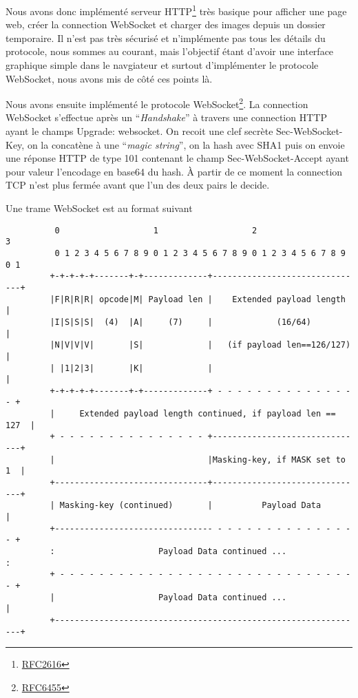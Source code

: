 \documentclass[a4paper,10pt]{article} %
\begin{document}
Nous avons donc implémenté serveur \textrm{HTTP}\footnote{\href{https://tools.ietf.org/html/rfc2616}{RFC2616}} très basique pour afficher une page web, créer la connection WebSocket et charger des images depuis un dossier temporaire. Il n'est pas très sécurisé et n'implémente pas tous les détails du protocole, nous sommes au courant, mais l'objectif étant d'avoir une interface graphique simple dans le navgiateur et surtout d'implémenter le protocole WebSocket, nous avons mis de côté ces points là.

Nous avons ensuite implémenté le protocole \textrm{WebSocket}\footnote{\href{https://tools.ietf.org/html/rfc6455}{RFC6455}}. La connection WebSocket s'effectue après un ``\textit{Handshake}'' à travers une connection \textrm{HTTP} ayant le champs \textrm{Upgrade: websocket}. On recoit une clef secrète \textrm{Sec-WebSocket-Key}, on la concatène à une ``\textit{magic string}'', on la hash avec \textrm{SHA1} puis on envoie une réponse \textrm{HTTP} de type 101 contenant le champ \textrm{Sec-WebSocket-Accept} ayant pour valeur l'encodage en base64 du hash. À partir de ce moment la connection TCP n'est plus fermée avant que l'un des deux pairs le decide.

Une trame WebSocket est au format suivant

\begin{verbatim}
          0                   1                   2                   3
          0 1 2 3 4 5 6 7 8 9 0 1 2 3 4 5 6 7 8 9 0 1 2 3 4 5 6 7 8 9 0 1
         +-+-+-+-+-------+-+-------------+-------------------------------+
         |F|R|R|R| opcode|M| Payload len |    Extended payload length    |
         |I|S|S|S|  (4)  |A|     (7)     |             (16/64)           |
         |N|V|V|V|       |S|             |   (if payload len==126/127)   |
         | |1|2|3|       |K|             |                               |
         +-+-+-+-+-------+-+-------------+ - - - - - - - - - - - - - - - +
         |     Extended payload length continued, if payload len == 127  |
         + - - - - - - - - - - - - - - - +-------------------------------+
         |                               |Masking-key, if MASK set to 1  |
         +-------------------------------+-------------------------------+
         | Masking-key (continued)       |          Payload Data         |
         +-------------------------------- - - - - - - - - - - - - - - - +
         :                     Payload Data continued ...                :
         + - - - - - - - - - - - - - - - - - - - - - - - - - - - - - - - +
         |                     Payload Data continued ...                |
         +---------------------------------------------------------------+
\end{verbatim}
\end{document}
